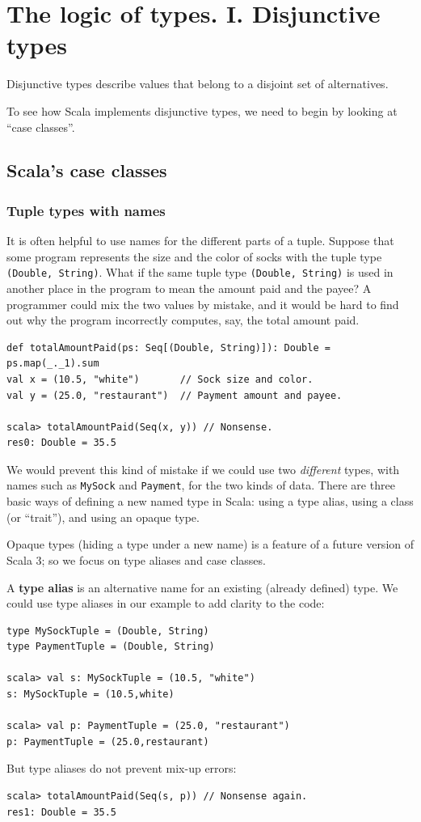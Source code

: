 
\chapter{The logic of types. I. Disjunctive types\label{chap:Disjunctive-types}}

Disjunctive types describe values that belong to a disjoint set of
alternatives. 

To see how Scala implements disjunctive types, we need to begin by
looking at ``case classes''.

\section{Scala's case classes}

\subsection{Tuple types with names}

It is often helpful to use names for the different parts of a tuple.
Suppose that some program represents the size and the color of socks
with the tuple type \lstinline!(Double, String)!. What if the same
tuple type \lstinline!(Double, String)! is used in another place
in the program to mean the amount paid and the payee? A programmer
could mix the two values by mistake, and it would be hard to find
out why the program incorrectly computes, say, the total amount paid.
\begin{lstlisting}
def totalAmountPaid(ps: Seq[(Double, String)]): Double = ps.map(_._1).sum
val x = (10.5, "white")       // Sock size and color.
val y = (25.0, "restaurant")  // Payment amount and payee.

scala> totalAmountPaid(Seq(x, y)) // Nonsense.
res0: Double = 35.5
\end{lstlisting}

We would prevent this kind of mistake if we could use two \emph{different}
types, with names such as \lstinline!MySock! and \lstinline!Payment!,
for the two kinds of data. There are  three basic ways of defining
a new named type in Scala: using a type alias, using a class (or ``trait''),
and using an opaque type. 

Opaque types (hiding a type under a new name) is a feature of a future
version of Scala 3; so we focus on type aliases and case classes.

A \textbf{type alias} is an alternative name for
an existing (already defined) type. We could use type aliases in our
example to add clarity to the code:
\begin{lstlisting}
type MySockTuple = (Double, String)
type PaymentTuple = (Double, String)

scala> val s: MySockTuple = (10.5, "white")
s: MySockTuple = (10.5,white)

scala> val p: PaymentTuple = (25.0, "restaurant")
p: PaymentTuple = (25.0,restaurant)
\end{lstlisting}
But type aliases do not prevent mix-up errors:
\begin{lstlisting}
scala> totalAmountPaid(Seq(s, p)) // Nonsense again.
res1: Double = 35.5
\end{lstlisting}

